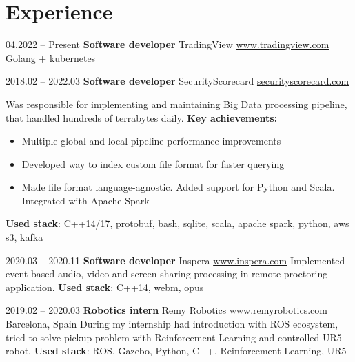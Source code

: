 \documentclass[11pt,a4paper]{moderncv}
\newcommand{\EngRus}[2]{#1}
\newcommand{\SunshinePalace}{\EngRus{Barcelona, Spain}{Барселона, Испания}}
\newcommand{\UsedStack}{\textbf{\EngRus{Used stack}{Используемый Стек}}: }
\newcommand{\WorkSingleDate}[2]{\small{#1.#2}}
\newcommand{\WorkDate}[4]{\small{\EngRus{#2.#1 -- #4.#3}{#1.#2 -- #3.#4}}}
\begin{document}
\maketitle
\section{\EngRus{Experience}{Опыт}}
\cventry
  {\WorkSingleDate{04}{2022} -- \EngRus{Present}{н.в.}}
  {\bfseries \EngRus{Software developer}{Разработчик ПО}}
  {TradingView \url{www.tradingview.com}}{}{}
  {
    \EngRus{Golang + kubernetes}
    {Golang + kubernetes}
  }

\cventry
  {\WorkDate{02}{2018}{03}{2022}}
  {\bfseries \EngRus{Software developer}{Разработчик ПО}}
  {SecurityScorecard \url{securityscorecard.com}}{}{}
  {
    \EngRus{Was responsible for implementing and maintaining Big Data processing pipeline, that handled hundreds of terrabytes daily.}
    {Разрабатывал и поддерживал пайплайн для больших данных, который обрабатывал сотни террабайт в день.}
    \newline{}\textbf{\EngRus{Key achievements}{Ключевые достижения}:}
    \begin{itemize}
      \item \EngRus{Multiple global and local pipeline performance improvements}{Множественные глобальные и локальные улучшения производительности пайплайна}
      \item \EngRus{Developed way to index custom file format for faster querying}{Реализовал индексацию файлов для быстрого поиска интересующих событий}
      \item \EngRus{Made file format language-agnostic. Added support for Python and Scala. Integrated with Apache Spark}
                   {Упростил формат файла, добавил поддержку Python и Scala. Интегрировал формат с Apache Spark}
    \end{itemize}
    \UsedStack{} C++14/17, protobuf, bash, sqlite, scala, apache spark, python, aws s3, kafka
  }

\cventry
  {\WorkDate{03}{2020}{11}{2020}}
  {\bfseries \EngRus{Software developer}{Разработчик ПО}}
  {Inspera \url{www.inspera.com}}{}{}
  {
    \EngRus{Implemented event-based audio, video and screen sharing processing in remote proctoring application.}
    {Реализовывал событийную обработку аудио, видео в приложении удалённого тестирования.}
    \newline{}\UsedStack{} C++14, webm, opus
  }

\cventry
  {\WorkDate{02}{2019}{03}{2020}}
  {\bfseries \EngRus{Robotics intern}{Стажёр робототехники}}
  {Remy Robotics \url{www.remyrobotics.com}} { \SunshinePalace }{}
  {\EngRus{During my internship had introduction with ROS ecosystem, tried to solve pickup problem with Reinforcement Learning and controlled UR5 robot.}
  {Во время стажировки познакомился с экосистемой ROS, использовал обучение с подкреплением для решения задачи захвата объектов и управлял роботом UR5.}
    \newline{}\UsedStack{} ROS, Gazebo, Python, C++, \EngRus{Reinforcement Learning}{Обучение с подкреплением}, UR5}
\end{document}
